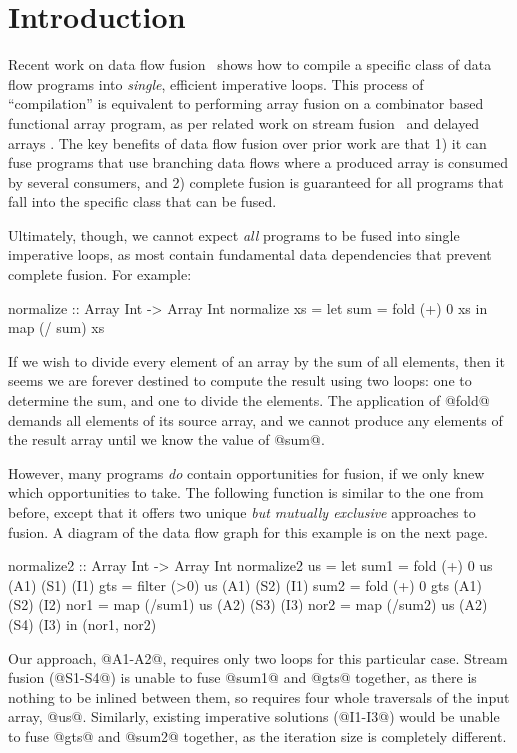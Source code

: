 \section{Introduction}

Recent work on data flow fusion~\cite{lippmeier2013flow} shows how to compile a specific class of data flow programs into \emph{single}, efficient imperative loops. This process of ``compilation'' is equivalent to performing array fusion on a combinator based functional array program, as per related work on stream fusion~\cite{coutts2007streamfusion} and delayed arrays \cite{keller2010repa}. The key benefits of data flow fusion over prior work are that 1) it can fuse programs that use branching data flows where a produced array is consumed by several consumers, and 2) complete fusion is guaranteed for all programs that fall into the specific class that can be fused. 



Ultimately, though, we cannot expect \emph{all} programs to be fused into single imperative loops, as most contain fundamental data dependencies that prevent complete fusion. For example:
\begin{code}
  normalize :: Array Int -> Array Int
  normalize xs = let sum = fold (+) 0 xs
                 in  map (/ sum) xs
\end{code}

If we wish to divide every element of an array by the sum of all elements, then it seems we are forever destined to compute the result using two loops: one to determine the sum, and one to divide the elements. The application of @fold@ demands all elements of its source array, and we cannot produce any elements of the result array until we know the value of @sum@.

However, many programs \emph{do} contain opportunities for fusion, if we only knew which opportunities to take. The following function is similar to the one from before, except that it offers two unique \emph{but mutually exclusive} approaches to fusion. A diagram of the data flow graph for this example is on the next page.


\begin{code}
 normalize2 :: Array Int -> Array Int
 normalize2 us
  = let sum1 = fold   (+) 0 us      (A1) (S1) (I1)
        gts  = filter (>0)  us      (A1) (S2) (I1)
        sum2 = fold   (+) 0 gts     (A1) (S2) (I2)
        nor1 = map  (/sum1) us      (A2) (S3) (I3)
        nor2 = map  (/sum2) us      (A2) (S4) (I3)
    in (nor1, nor2)
\end{code}
Our approach, @A1-A2@, requires only two loops for this particular case.
Stream fusion (@S1-S4@) is unable to fuse @sum1@ and @gts@ together, as there is nothing to be inlined between them, so requires four whole traversals of the input array, @us@.
Similarly, existing imperative solutions (@I1-I3@) would be unable to fuse @gts@ and @sum2@ together, as the iteration size is completely different.

